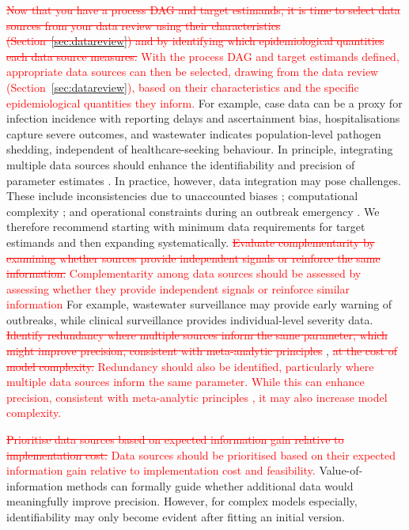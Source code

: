 \documentclass{article}
\begin{document}
\textcolor{red}{\st{Now that you have a process DAG and target estimands, it is time to select data sources  from your data review using their characteristics (Section~\ref{sec:datareview}) and by identifying which epidemiological quantities each data source measures.}} 
\textcolor{red}{With the process DAG and target estimands defined, appropriate data sources can then be selected, drawing from the data review (Section~\ref{sec:datareview}), based on their characteristics and the specific epidemiological quantities they inform.}
For example, case data can be a proxy for infection incidence with reporting delays and ascertainment bias, hospitalisations capture severe outcomes, and wastewater indicates population-level pathogen shedding, independent of healthcare-seeking behaviour.
In principle, integrating multiple data sources should enhance the identifiability and precision of parameter estimates \citep{deangelis2018analysing, lison2024generative, russell2024combined, birrell2025real}. In practice, however, data integration may pose challenges. 
These include inconsistencies due to unaccounted biases \citep{presanis2013conflict,knock2021key, Ward2024-sp, corbella2022inferring}; computational complexity \citep{corbella2022inferring}; and operational constraints during an outbreak emergency \citep{mccaw2023role}.
We therefore recommend starting with minimum data requirements for target estimands and then expanding systematically. 
\textcolor{red}{\st{Evaluate complementarity by examining whether sources provide independent signals or reinforce the same information.}}
\textcolor{red}{Complementarity among data sources should be assessed by assessing whether they provide independent signals or reinforce similar information}
For example, wastewater surveillance may provide early warning of outbreaks, while clinical surveillance provides individual-level severity data.
\textcolor{red}{\st{Identify redundancy where multiple sources inform the same parameter, which might improve precision, consistent with meta-analytic principles}} \citep{deangelis2018analysing,borenstein2021introduction}, \textcolor{red}{\st{at the cost of model complexity.}}
\textcolor{red}{Redundancy should also be identified, particularly  where multiple data sources inform the same parameter. While this can enhance precision, consistent with meta-analytic principles \citep{deangelis2018analysing,borenstein2021introduction}, it may also increase model complexity.}

\textcolor{red}{\st{Prioritise data sources based on expected information gain relative to implementation cost.}}
\textcolor{red}{Data sources should be prioritised based on their expected information gain relative to implementation cost and feasibility.}
Value-of-information methods \citep{jackson2019value,heath2024value} can formally guide whether additional data would meaningfully improve precision.
However, for complex models especially, identifiability may only become evident after fitting an initial version.
\end{document}
